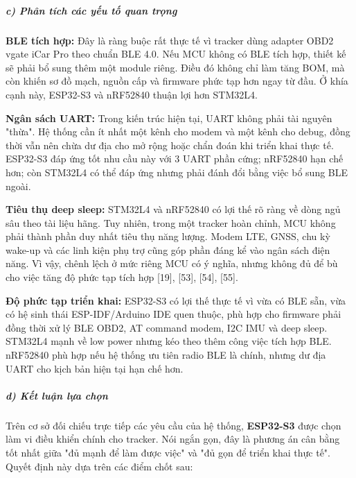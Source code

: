 \documentclass[a4paper]{extarticle}
\begin{document}
\subparagraph{c) Phân tích các yếu tố quan
trọng}\label{c-phuxe2n-tuxedch-cuxe1c-yux1ebfu-tux1ed1-quan-trux1ecdng}

\textbf{BLE tích hợp:} Đây là ràng buộc rất thực tế vì tracker dùng
adapter OBD2 vgate iCar Pro theo chuẩn BLE 4.0. Nếu MCU không có BLE
tích hợp, thiết kế sẽ phải bổ sung thêm một module riêng. Điều đó không
chỉ làm tăng BOM, mà còn khiến sơ đồ mạch, nguồn cấp và firmware phức
tạp hơn ngay từ đầu. Ở khía cạnh này, ESP32-S3 và nRF52840 thuận lợi hơn
STM32L4.

\textbf{Ngân sách UART:} Trong kiến trúc hiện tại, UART không phải tài
nguyên "thừa". Hệ thống cần ít nhất một kênh cho modem và một kênh cho
debug, đồng thời vẫn nên chừa dư địa cho mở rộng hoặc chẩn đoán khi
triển khai thực tế. ESP32-S3 đáp ứng tốt nhu cầu này với 3 UART phần
cứng; nRF52840 hạn chế hơn; còn STM32L4 có thể đáp ứng nhưng phải đánh
đổi bằng việc bổ sung BLE ngoài.

\textbf{Tiêu thụ deep sleep:} STM32L4 và nRF52840 có lợi thế rõ ràng về
dòng ngủ sâu theo tài liệu hãng. Tuy nhiên, trong một tracker hoàn chỉnh,
MCU không phải thành phần duy nhất tiêu thụ năng lượng. Modem LTE, GNSS,
chu kỳ wake-up và các linh kiện phụ trợ cũng góp phần đáng kể vào ngân
sách điện năng. Vì vậy, chênh lệch ở mức riêng MCU có ý nghĩa, nhưng
không đủ để bù cho việc tăng độ phức tạp tích hợp {[}19{]}, {[}53{]},
{[}54{]}, {[}55{]}.

\textbf{Độ phức tạp triển khai:} ESP32-S3 có lợi thế thực tế vì vừa có
BLE sẵn, vừa có hệ sinh thái ESP-IDF/Arduino IDE quen thuộc, phù hợp cho
firmware phải đồng thời xử lý BLE OBD2, AT command modem, I2C IMU và
deep sleep. STM32L4 mạnh về low power nhưng kéo theo thêm công việc tích
hợp BLE. nRF52840 phù hợp nếu hệ thống ưu tiên radio BLE là chính, nhưng
dư địa UART cho kịch bản hiện tại hạn chế hơn.

\subparagraph{d) Kết luận lựa
chọn}\label{d-kux1ebft-luux1eadn-lux1ef1a-chux1ecdn}

Trên cơ sở đối chiếu trực tiếp các yêu cầu của hệ thống,
\textbf{ESP32-S3} được chọn làm vi điều khiển chính cho tracker. Nói ngắn
gọn, đây là phương án cân bằng tốt nhất giữa "đủ mạnh để làm được việc"
và "đủ gọn để triển khai thực tế". Quyết định này dựa trên các điểm chốt
sau:
\end{document}
